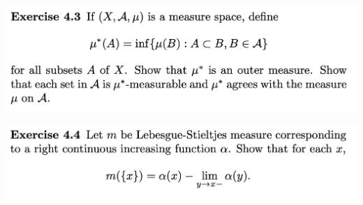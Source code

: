 \newpage
\begin{mdframed}
\includegraphics[width=400pt]{img/analysis--berkeley-202a-hw-0d98.png}
\end{mdframed}


\newpage
\begin{mdframed}
\includegraphics[width=400pt]{img/analysis--berkeley-202a-hw-e9e2.png}
\end{mdframed}
